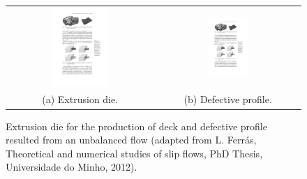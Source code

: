 \begin{figure}[!htb]
\centering
\begin{tabular}{@{}c@{\hskip 1.5cm}c@{}}
\includegraphics[width=0.4\textwidth]{chap1/include/figures/extrusion_die.pdf}
& \includegraphics[width=0.3\textwidth]{chap1/include/figures/deck.pdf}\\
\small (a) Extrusion die. & \small (b) Defective profile.
\end{tabular}
\caption[Extrusion die for the production of deck and defective profile resulted from an unbalanced flow.]{Extrusion die for the production of deck and defective profile resulted from an unbalanced flow (adapted from L. Ferr\'as, Theoretical and numerical studies of slip flows, PhD Thesis, Universidade do Minho, 2012).}
\label{chap1:fig:polymer_processing_extrusion_deffects}
\end{figure}

